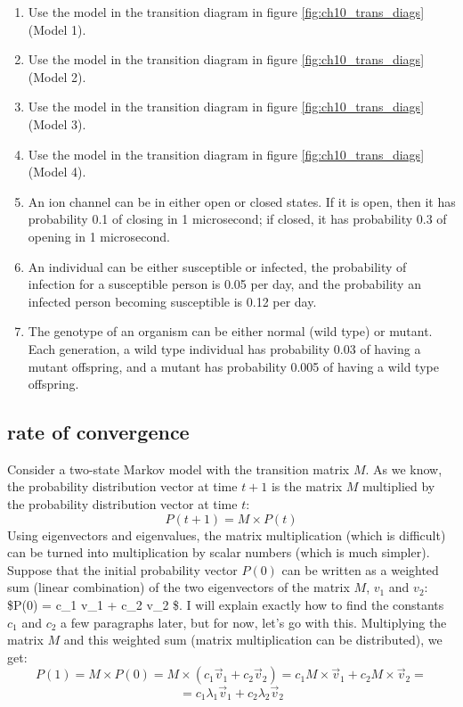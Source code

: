 \documentclass[
  letterpaper,
  DIV=11,
  numbers=noendperiod]{scrreprt}
\begin{document}
\begin{enumerate}
\def\labelenumi{\arabic{enumi}.}
\item
  Use the model in the transition diagram in figure
  \ref{fig:ch10_trans_diags} (Model 1).
\item
  Use the model in the transition diagram in figure
  \ref{fig:ch10_trans_diags} (Model 2).
\item
  Use the model in the transition diagram in figure
  \ref{fig:ch10_trans_diags} (Model 3).
\item
  Use the model in the transition diagram in figure
  \ref{fig:ch10_trans_diags} (Model 4).
\item
  An ion channel can be in either open or closed states. If it is open,
  then it has probability 0.1 of closing in 1 microsecond; if closed, it
  has probability 0.3 of opening in 1 microsecond.
\item
  An individual can be either susceptible or infected, the probability
  of infection for a susceptible person is 0.05 per day, and the
  probability an infected person becoming susceptible is 0.12 per day.
\item
  The genotype of an organism can be either normal (wild type) or
  mutant. Each generation, a wild type individual has probability 0.03
  of having a mutant offspring, and a mutant has probability 0.005 of
  having a wild type offspring.
\end{enumerate}

\subsection{rate of convergence}

Consider a two-state Markov model with the transition matrix \(M\). As
we know, the probability distribution vector at time \(t+1\) is the
matrix \(M\) multiplied by the probability distribution vector at time
\(t\): \[ P(t+1) = M \times P(t) \] Using eigenvectors and eigenvalues,
the matrix multiplication (which is difficult) can be turned into
multiplication by scalar numbers (which is much simpler). Suppose that
the initial probability vector \(P(0)\) can be written as a weighted sum
(linear combination) of the two eigenvectors of the matrix \(M\),
\(v_1\) and \(v_2\): \$P(0) = c\_1 \vec v\_1 + c\_2 \vec v\_2 \$. I will
explain exactly how to find the constants \(c_1\) and \(c_2\) a few
paragraphs later, but for now, let's go with this. Multiplying the
matrix \(M\) and this weighted sum (matrix multiplication can be
distributed), we get:
\[ P(1) = M \times P(0) =  M \times (c_1 \vec v_1 + c_2 \vec v_2) = c_1 M \times \vec v_1 + c_2 M \times  \vec v_2  =  \]
\[ = c_1 \lambda_1\vec v_1 + c_2 \lambda_2 \vec v_2 \]
\end{document}
